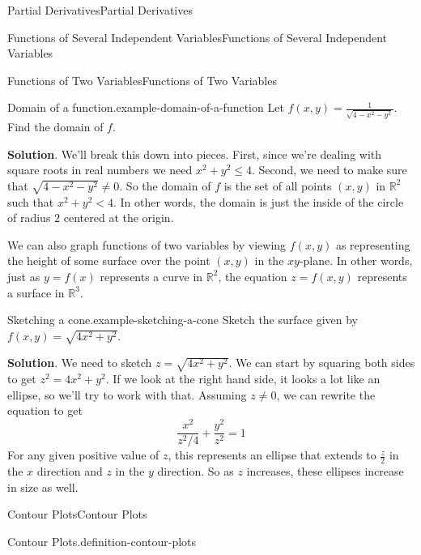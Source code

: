 \documentclass[10pt,]{book}
\numberwithin{equation}{section}
\newcommand{\RR}{\mathbb{R}}
\begin{document}
\begin{chapterptx}{Partial Derivatives}{}{Partial Derivatives}{}{}
\begin{sectionptx}{Functions of Several Independent Variables}{}{Functions of Several Independent Variables}{}{}
\begin{subsectionptx}{Functions of Two Variables}{}{Functions of Two Variables}{}{}
\begin{example}{Domain of a function.}{example-domain-of-a-function}%
\hypertarget{p-1113}{}%
Let \(f(x,y) = \frac{1}{\sqrt{4 - x^{2} - y^{2}}}\). Find the domain of \(f\).%
\par\smallskip%
\noindent\textbf{Solution}.\hypertarget{solution-169}{}\quad%
\hypertarget{p-1114}{}%
We'll break this down into pieces. First, since we're dealing with square roots in real numbers we need \(x^{2}+y^{2}\leq4\). Second, we need to make sure that \(\sqrt{4 - x^{2} - y^{2}}\neq0\). So the domain of \(f\) is the set of all points \((x,y)\) in \(\RR^{2}\) such that \(x^{2} + y^{2} < 4\). In other words, the domain is just the inside of the circle of radius \(2\) centered at the origin.%
\end{example}
\hypertarget{p-1115}{}%
We can also graph functions of two variables by viewing \(f(x,y)\) as representing the height of some surface over the point \((x,y)\) in the \(xy\)-plane. In other words, just as \(y = f(x)\) represents a curve in \(\RR^{2}\), the equation \(z = f(x,y)\) represents a surface in \(\RR^{3}\).%
\begin{example}{Sketching a cone.}{example-sketching-a-cone}%
\hypertarget{p-1116}{}%
Sketch the surface given by \(f(x,y) = \sqrt{4x^{2} + y^{2}}\).%
\par\smallskip%
\noindent\textbf{Solution}.\hypertarget{solution-170}{}\quad%
\hypertarget{p-1117}{}%
We need to sketch \(z = \sqrt{4x^{2} + y^{2}}\). We can start by squaring both sides to get \(z^{2} = 4x^{2} + y^{2}\). If we look at the right hand side, it looks a lot like an ellipse, so we'll try to work with that. Assuming \(z\neq0\), we can rewrite the equation to get%
\begin{equation*}
\frac{x^{2}}{z^{2}/4} + \frac{y^{2}}{z^{2}} = 1
\end{equation*}
For any given positive value of \(z\), this represents an ellipse that extends to \(\frac{z}{2}\) in the \(x\) direction and \(z\) in the \(y\) direction. So as \(z\) increases, these ellipses increase in size as well.%
\end{example}
\end{subsectionptx}
%
%
\typeout{************************************************}
\typeout{************************************************}
%
\begin{subsectionptx}{Contour Plots}{}{Contour Plots}{}{}\label{subsection-contour-plots}
\begin{definition}{Contour Plots.}{definition-contour-plots}%

\end{definition}
\end{subsectionptx}
\end{sectionptx}
\end{chapterptx}
\end{document}
